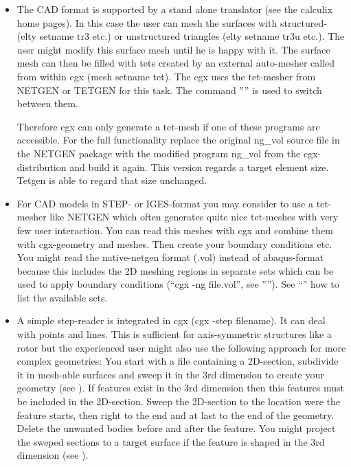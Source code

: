 \documentclass{article}
\begin{document}
\begin{appendix}
\begin{itemize}

\item The CAD format is supported by a stand alone translator (see the calculix home pages). In this case the user can mesh the surfaces with structured- \cite{Coons} (elty setname tr3 etc.) or unstructured triangles \cite{mesh2d} (elty setname tr3u etc.). The user might modify this surface mesh until he is happy with it. The surface mesh can then be filled with tets created by an external auto-mesher called from within cgx (mesh setname tet). The cgx uses the tet-mesher from NETGEN \cite{NETGEN} or TETGEN \cite{TETGEN} for this task. The command '''' is used to switch between them.

Therefore cgx can only generate a tet-mesh if one of these programs are accessible. For the full functionality replace the original ng\_vol source file in the NETGEN package with the modified program ng\_vol from the cgx-distribution and build it again. This version regards a target element size. Tetgen is able to regard that size unchanged.

\item For CAD models in STEP- or IGES-format you may consider to use a tet-mesher like NETGEN \cite{NETGEN} which often generates quite nice tet-meshes with very few user interaction. You can read this meshes with cgx and combine them with cgx-geometry and meshes. Then create your boundary conditions etc. You might read the native-netgen format (.vol) instead of abaqus-format because this includes the 2D meshing regions in separate sets which can be used to apply boundary conditions (``cgx -ng file.vol'', see ''''). See ``'' how to list the available sets.

\item A simple step-reader is integrated in cgx (cgx -step filename). It can deal with points and lines. This is sufficient for axis-symmetric structures like a rotor but the experienced user might also use the following approach for more complex geometries: You start with a file containing a 2D-section, subdivide it in mesh-able surfaces and sweep it in the 3rd dimension to create your geometry (see ). If features exist in the 3rd dimension then this features must be included in the 2D-section. Sweep the 2D-section to the location were the feature starts, then right to the end and at last to the end of the geometry. Delete the unwanted bodies before and after the feature. You might project the sweped sections to a target surface if the feature is shaped in the 3rd dimension (see ).


\end{itemize}
\end{appendix}
\end{document}
